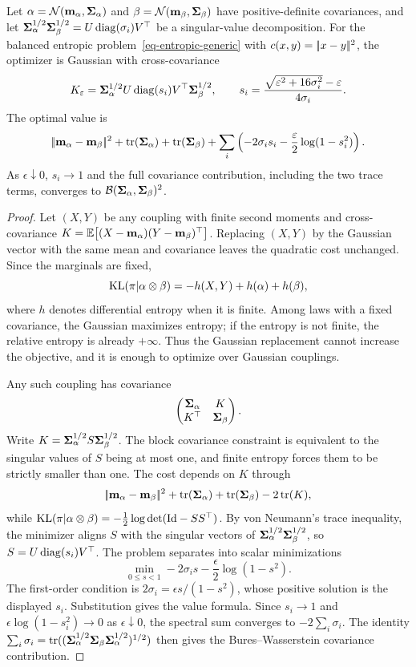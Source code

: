 \begin{prop}\label{prop-gaussian-sinkhorn-closed-form}
	Let $\alpha=\mathcal{N}(\mathbf{m}_\alpha,\mathbf{\Sigma}_\alpha)$ and $\beta=\mathcal{N}(\mathbf{m}_\beta,\mathbf{\Sigma}_\beta)$ have positive-definite covariances, and let $\mathbf{\Sigma}_\alpha^{1/2}\mathbf{\Sigma}_\beta^{1/2}=U\operatorname{diag}(\sigma_i)V^\top$ be a singular-value decomposition. For the balanced entropic problem~\eqref{eq-entropic-generic} with $c(x,y)=|\!| x-y |\!|^2$,
	the optimizer is Gaussian with cross-covariance
	\[
		K_\varepsilon
		=
		\mathbf{\Sigma}_\alpha^{1/2}
		U\operatorname{diag}(s_i)V^\top
		\mathbf{\Sigma}_\beta^{1/2},
		\qquad
		s_i
		=
		\frac{\sqrt{\varepsilon^2+16\sigma_i^2}-\varepsilon}{4\sigma_i}.
	\]
	The optimal value is
	\[
		|\!| \mathbf{m}_\alpha-\mathbf{m}_\beta |\!|^2
		+
		\operatorname{tr}(\mathbf{\Sigma}_\alpha)+\operatorname{tr}(\mathbf{\Sigma}_\beta)
		+
		\sum_i
		\left(
			-2\sigma_i s_i
			-\frac{\varepsilon}{2}\log(1-s_i^2)
		\right).
	\]
	As $\epsilon\downarrow0$, $s_i\to1$ and the full covariance contribution, including the two trace terms, converges to $\mathcal{B}(\mathbf{\Sigma}_\alpha,\mathbf{\Sigma}_\beta)^2$.
\end{prop}

\begin{proof}
	Let $(X,Y)$ be any coupling with finite second moments and cross-covariance
	\(K=\mathbb{E}\big[(X-\mathbf{m}_\alpha)(Y-\mathbf{m}_\beta)^\top\big]\).
	Replacing $(X,Y)$ by the Gaussian vector with the same mean and covariance leaves the quadratic cost unchanged. Since the marginals are fixed,
	\[
		\operatorname{KL}(\pi|\alpha\otimes\beta)
		=
		-h(X,Y)+h(\alpha)+h(\beta),
	\]
	where $h$ denotes differential entropy when it is finite. Among laws with a fixed covariance, the Gaussian maximizes entropy; if the entropy is not finite, the relative entropy is already $+\infty$. Thus the Gaussian replacement cannot increase the objective, and it is enough to optimize over Gaussian couplings.

	Any such coupling has covariance
	\[
		\begin{pmatrix}
			\mathbf{\Sigma}_\alpha & K\\
			K^\top & \mathbf{\Sigma}_\beta
		\end{pmatrix}.
	\]
	Write $K=\mathbf{\Sigma}_\alpha^{1/2}S\mathbf{\Sigma}_\beta^{1/2}$. The block covariance constraint is equivalent to the singular values of $S$ being at most one, and finite entropy forces them to be strictly smaller than one. The cost depends on $K$ through
	\[
		|\!| \mathbf{m}_\alpha-\mathbf{m}_\beta |\!|^2+\operatorname{tr}(\mathbf{\Sigma}_\alpha)+\operatorname{tr}(\mathbf{\Sigma}_\beta)-2\operatorname{tr}(K),
	\]
	while $\operatorname{KL}(\pi|\alpha\otimes\beta)=-\frac12\log\det(\mathrm{Id}-SS^\top)$.
	By von Neumann's trace inequality, the minimizer aligns $S$ with the singular vectors of $\mathbf{\Sigma}_\alpha^{1/2}\mathbf{\Sigma}_\beta^{1/2}$, so $S=U\operatorname{diag}(s_i)V^\top$. The problem separates into scalar minimizations
	\[
		\min_{0\leq s<1}
		-2\sigma_i s-\frac{\epsilon}{2}\log(1-s^2).
	\]
	The first-order condition is $2\sigma_i=\epsilon s/(1-s^2)$, whose positive solution is the displayed $s_i$. Substitution gives the value formula. Since $s_i\to1$ and $\epsilon\log(1-s_i^2)\to0$ as $\epsilon\downarrow0$, the spectral sum converges to $-2\sum_i\sigma_i$. The identity $\sum_i\sigma_i=\operatorname{tr}((\mathbf{\Sigma}_\alpha^{1/2}\mathbf{\Sigma}_\beta\mathbf{\Sigma}_\alpha^{1/2})^{1/2})$ then gives the Bures--Wasserstein covariance contribution.
\end{proof}

